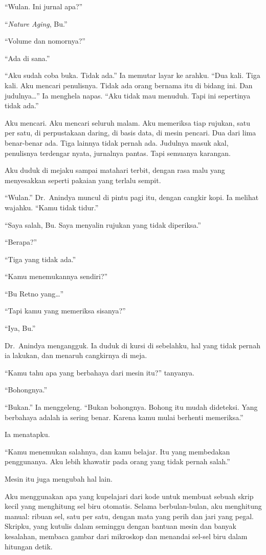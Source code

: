 \documentclass[11pt,twoside,openany]{book}
\makeatletter
\newcommand{\scenebreak}{\par\vspace{0.9em}{\centering\textsc{*\hspace{0.7em}*\hspace{0.7em}*}\par}\vspace{0.9em}\@afterindentfalse\@afterheading}
\makeatother
\begin{document}
``Wulan. Ini jurnal apa?''

``\emph{Nature Aging}, Bu.''

``Volume dan nomornya?''

``Ada di sana.''

``Aku sudah coba buka. Tidak ada.'' Ia memutar layar ke arahku. ``Dua kali. Tiga kali. Aku mencari penulisnya. Tidak ada orang bernama itu di bidang ini. Dan judulnya\ldots{}'' Ia menghela napas. ``Aku tidak mau menuduh. Tapi ini sepertinya tidak ada.''

Aku mencari. Aku mencari seluruh malam. Aku memeriksa tiap rujukan, satu per satu, di perpustakaan daring, di basis data, di mesin pencari. Dua dari lima benar-benar ada. Tiga lainnya tidak pernah ada. Judulnya masuk akal, penulisnya terdengar nyata, jurnalnya pantas. Tapi semuanya karangan.

Aku duduk di mejaku sampai matahari terbit, dengan rasa malu yang menyesakkan seperti pakaian yang terlalu sempit.

``Wulan.'' Dr.~Anindya muncul di pintu pagi itu, dengan cangkir kopi. Ia melihat wajahku. ``Kamu tidak tidur.''

``Saya salah, Bu. Saya menyalin rujukan yang tidak diperiksa.''

``Berapa?''

``Tiga yang tidak ada.''

``Kamu menemukannya sendiri?''

``Bu Retno yang\ldots{}''

``Tapi kamu yang memeriksa sisanya?''

``Iya, Bu.''

Dr.~Anindya mengangguk. Ia duduk di kursi di sebelahku, hal yang tidak pernah ia lakukan, dan menaruh cangkirnya di meja.

``Kamu tahu apa yang berbahaya dari mesin itu?'' tanyanya.

``Bohongnya.''

``Bukan.'' Ia menggeleng. ``Bukan bohongnya. Bohong itu mudah dideteksi. Yang berbahaya adalah ia sering benar. Karena kamu mulai berhenti memeriksa.''

Ia menatapku.

``Kamu menemukan salahnya, dan kamu belajar. Itu yang membedakan penggunanya. Aku lebih khawatir pada orang yang tidak pernah salah.''

\scenebreak
Mesin itu juga mengubah hal lain.

Aku menggunakan apa yang kupelajari dari kode untuk membuat sebuah skrip kecil yang menghitung sel biru otomatis. Selama berbulan-bulan, aku menghitung manual: ribuan sel, satu per satu, dengan mata yang perih dan jari yang pegal. Skripku, yang kutulis dalam seminggu dengan bantuan mesin dan banyak kesalahan, membaca gambar dari mikroskop dan menandai sel-sel biru dalam hitungan detik.
\end{document}

